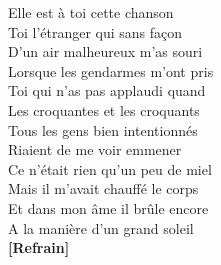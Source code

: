 \documentclass{novel}
\begin{document}
\begin{multicols}{2}
Elle est à toi cette chanson \\
Toi l'étranger qui sans façon \\
D'un air malheureux m'as souri \\
Lorsque les gendarmes m'ont pris \\
Toi qui n'as pas applaudi quand \\
Les croquantes et les croquants \\
Tous les gens bien intentionnés \\
Riaient de me voir emmener \\
Ce n'était rien qu'un peu de miel \\
Mais il m'avait chauffé le corps \\
Et dans mon âme il brûle encore \\
A la manière d'un grand soleil \\

\textbf{[Refrain]}
\end{multicols}

\newpage
\footnotesize
\end{document}
